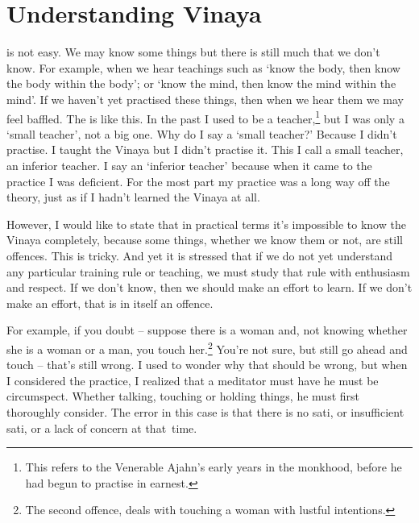 
\chapter{Understanding Vinaya}

 is not easy. We may know some things but there is still much that we don't know. For example, when we hear teachings such as `know the body, then know the body within the body'; or `know the mind, then know the mind within the mind'. If we haven't yet practised these things, then when we hear them we may feel baffled. The  is like this. In the past I used to be a teacher,\footnote{This refers to the Venerable Ajahn's early years in the monkhood, before he had begun to practise in earnest.} but I was only a `small teacher', not a big one. Why do I say a `small teacher?' Because I didn't practise. I taught the Vinaya but I didn't practise it. This I call a small teacher, an inferior teacher. I say an `inferior teacher' because when it came to the practice I was deficient. For the most part my practice was a long way off the theory, just as if I hadn't learned the Vinaya at all. 

However, I would like to state that in practical terms it's impossible to know the Vinaya completely, because some things, whether we know them or not, are still offences. This is tricky. And yet it is stressed that if we do not yet understand any particular training rule or teaching, we must study that rule with enthusiasm and respect. If we don't know, then we should make an effort to learn. If we don't make an effort, that is in itself an offence. 

For example, if you doubt -- suppose there is a woman and, not knowing whether she is a woman or a man, you touch her.\footnote{The second  offence, deals with touching a woman with lustful intentions.} You're not sure, but still go ahead and touch -- that's still wrong. I used to wonder why that should be wrong, but when I considered the practice, I realized that a meditator must have  he must be circumspect. Whether talking, touching or holding things, he must first thoroughly consider. The error in this case is that there is no sati, or insufficient sati, or a lack of concern at that~time. 

